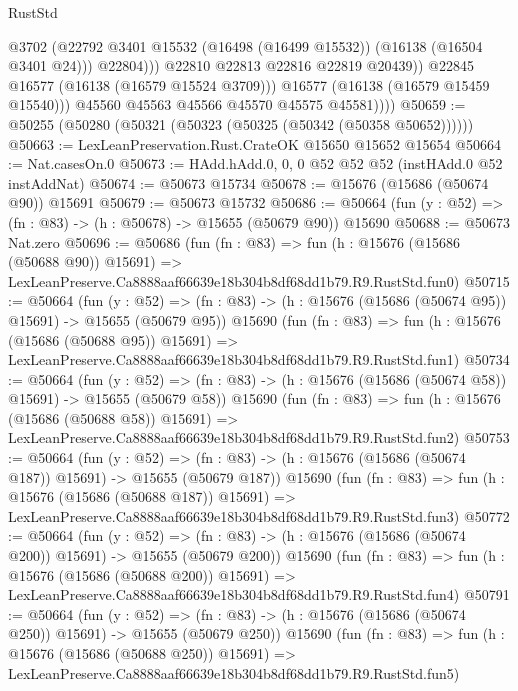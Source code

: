 \begin{lexlean}{RustStd}
\begin{coremodule}
                          @3702
                          (@22792 @3401 @15532 (@16498 (@16499 @15532)) (@16138 (@16504 @3401 @24)))
                          @22804)))
                    @22810
                    @22813
                    @22816
                    @22819
                    @20439))
                @22845
                @16577
                (@16138 (@16579 @15524 @3709)))
              @16577
              (@16138 (@16579 @15459 @15540)))
            @45560
            @45563
            @45566
            @45570
            @45575
            @45581))))
@50659 := @50255 (@50280 (@50321 (@50323 (@50325 (@50342 (@50358 @50652))))))
@50663 := LexLeanPreservation.Rust.CrateOK @15650 @15652 @15654
@50664 := Nat.casesOn.{0}
@50673 := HAdd.hAdd.{0, 0, 0} @52 @52 @52 (instHAdd.{0} @52 instAddNat)
@50674 := @50673 @15734
@50678 := @15676 (@15686 (@50674 @90)) @15691
@50679 := @50673 @15732
@50686 := @50664 (fun (y : @52) => (fn : @83) -> (h : @50678) -> @15655 (@50679 @90)) @15690
@50688 := @50673 Nat.zero
@50696 := @50686
    (fun (fn : @83) =>
    fun (h : @15676 (@15686 (@50688 @90)) @15691) =>
    LexLeanPreserve.Ca8888aaf66639e18b304b8df68dd1b79.R9.RustStd.fun0)
@50715 := @50664
    (fun (y : @52) =>
    (fn : @83) -> (h : @15676 (@15686 (@50674 @95)) @15691) -> @15655 (@50679 @95))
    @15690
    (fun (fn : @83) =>
    fun (h : @15676 (@15686 (@50688 @95)) @15691) =>
    LexLeanPreserve.Ca8888aaf66639e18b304b8df68dd1b79.R9.RustStd.fun1)
@50734 := @50664
    (fun (y : @52) =>
    (fn : @83) -> (h : @15676 (@15686 (@50674 @58)) @15691) -> @15655 (@50679 @58))
    @15690
    (fun (fn : @83) =>
    fun (h : @15676 (@15686 (@50688 @58)) @15691) =>
    LexLeanPreserve.Ca8888aaf66639e18b304b8df68dd1b79.R9.RustStd.fun2)
@50753 := @50664
    (fun (y : @52) =>
    (fn : @83) -> (h : @15676 (@15686 (@50674 @187)) @15691) -> @15655 (@50679 @187))
    @15690
    (fun (fn : @83) =>
    fun (h : @15676 (@15686 (@50688 @187)) @15691) =>
    LexLeanPreserve.Ca8888aaf66639e18b304b8df68dd1b79.R9.RustStd.fun3)
@50772 := @50664
    (fun (y : @52) =>
    (fn : @83) -> (h : @15676 (@15686 (@50674 @200)) @15691) -> @15655 (@50679 @200))
    @15690
    (fun (fn : @83) =>
    fun (h : @15676 (@15686 (@50688 @200)) @15691) =>
    LexLeanPreserve.Ca8888aaf66639e18b304b8df68dd1b79.R9.RustStd.fun4)
@50791 := @50664
    (fun (y : @52) =>
    (fn : @83) -> (h : @15676 (@15686 (@50674 @250)) @15691) -> @15655 (@50679 @250))
    @15690
    (fun (fn : @83) =>
    fun (h : @15676 (@15686 (@50688 @250)) @15691) =>
    LexLeanPreserve.Ca8888aaf66639e18b304b8df68dd1b79.R9.RustStd.fun5)

\end{coremodule}
\end{lexlean}
